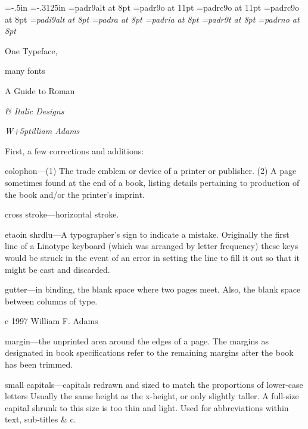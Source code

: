 %
%
\hsize=2in
\vsize=3.125in
%
\hoffset=-.5in
\voffset=-.3125in
\nopagenumbers
\frenchspacing
%
\font\pad=padr9alt at 8pt
\pad
\font\lr=padr9o at 11pt
\font\lsc=padrc9o at 11pt
\font\sc=padrc9o at 8pt
\font\it=padi9alt at 8pt
\font\alt=padra at 8pt
\font\altit=padria at 8pt
\font\padr=padr9t at 8pt
\font\padrno=padrno at 8pt
%
%

%
\hyphenchar{}
\topglue
\vfill

\hfill {\lr One Typeface,}

\hfill {\lsc many fonts\thinspace}
\vfill

\hfill A Guide to Roman\thinspace

\hfill {\it \& Italic Designs\thinspace}

\vfill

\hfill {\it {\altit W}\kern+\pnt5ptilliam {\altit A}dams}

\vfill

\break
\parindent=0pt
First, a few corrections and additions:

{\sc colophon}---(1) The trade emblem or device
of a printer or publisher. (2) A page sometimes found at the
end of a book, listing details pertaining
to production of the book and/or the
printer's imprint.

{\sc cross stroke}---horizontal stroke.

{\sc etaoin shrdlu}---A typographer's sign to
indicate a mistake. Originally the first
line of a Linotype keyboard (which was
arranged by letter frequency) these keys
would be struck in the event of an error
in setting the line to fill it out so that it
might be cast and discarded.

{\sc gutter}---in binding, the blank space where
two pages meet. Also, the blank space
between columns of type.
\vfill

{\padrno c} 1997 William F. Adams\hfill

\break
{\sc margin}---the unprinted area around the
edges of a page. The margins as
designated in book specifications refer
to the remaining margins after the book
has been trimmed.

{\sc small capitals}---capitals redrawn and sized
to match the proportions of lower-case
letters Usually the same height as
the x-height, or only slightly taller. A full-size
capital shrunk to this size is too thin
and light. Used for abbreviations within
text, sub-titles \& c.

